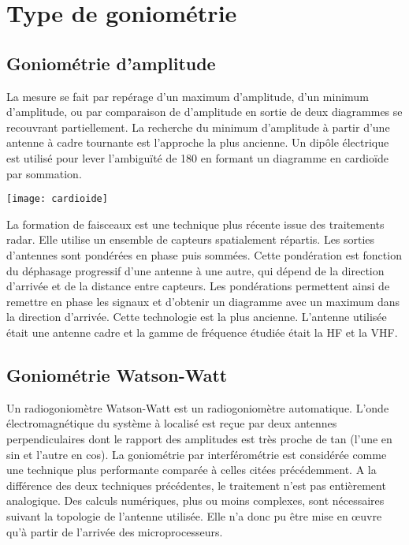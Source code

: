 \section{Type de goniométrie}

\subsection{Goniométrie d'amplitude}

	La mesure se fait par repérage d’un maximum d’amplitude, d’un minimum d’amplitude, ou par comparaison de d’amplitude en sortie de deux diagrammes se recouvrant partiellement. La recherche du minimum d’amplitude à partir d’une antenne à cadre tournante est l’approche la plus ancienne. Un dipôle électrique est utilisé pour lever l’ambiguïté de 180 en formant un diagramme en cardioïde par sommation.
	
\texttt{[image: cardioide]}
\parindent=15pt

	La formation de faisceaux est une technique plus récente issue des traitements radar. Elle utilise un ensemble de capteurs spatialement répartis. Les sorties d’antennes sont pondérées en phase puis sommées. Cette pondération est fonction du déphasage progressif d’une antenne à une autre, qui dépend de la direction d’arrivée et de la distance entre capteurs. Les pondérations permettent ainsi de remettre en phase les signaux et d’obtenir un diagramme avec un maximum dans la direction d’arrivée.
 Cette technologie est la plus ancienne. L’antenne utilisée était une antenne cadre et la gamme de fréquence étudiée était la HF et la VHF.

\subsection{Goniométrie Watson-Watt}

	Un radiogoniomètre Watson-Watt est un radiogoniomètre automatique. L’onde électromagnétique du système à localisé est reçue par deux antennes perpendiculaires dont le rapport des amplitudes est très proche de tan (l’une en sin et l’autre en cos). La goniométrie par interférométrie est considérée comme une technique plus performante comparée à celles citées précédemment. A la différence des deux techniques précédentes, le traitement n’est pas entièrement analogique. Des calculs numériques, plus ou moins complexes, sont nécessaires suivant la topologie de l’antenne utilisée. Elle n’a donc pu être mise en œuvre qu’à partir de l’arrivée des microprocesseurs.

